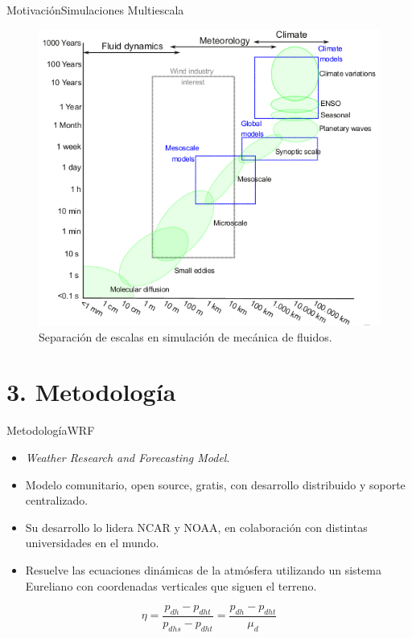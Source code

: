\documentclass[mathserif]{beamer}
\begin{document}
\begin{frame}{Motivación}{Simulaciones Multiescala}
	\begin{figure}[H]
		\centering
		\includegraphics[width=0.7\linewidth]{terraincog}
		\caption{Separación de escalas en simulación de mecánica de fluidos.}
		\label{fig:escalas}
	\end{figure}
\end{frame}

\section{3. Metodología}
\begin{frame}{Metodología}{WRF}
	\begin{itemize}\justifying
		\item \emph{Weather Research and Forecasting Model}.
		\item Modelo comunitario, open source, gratis, con desarrollo distribuido y soporte centralizado.
		\item Su desarrollo lo lidera NCAR y NOAA, en colaboración con distintas universidades en el mundo.
		\item Resuelve las ecuaciones dinámicas de la atmósfera utilizando un sistema Eureliano con coordenadas verticales que siguen el terreno.
	\end{itemize}
	
	\begin{equation}
	\eta = \frac{p_{dh}-p_{dht}}{p_{dhs} - p_{dht}} = \frac{p_{dh}-p_{dht}}{\mu_d}
	\end{equation}
\end{frame}
\end{document}
